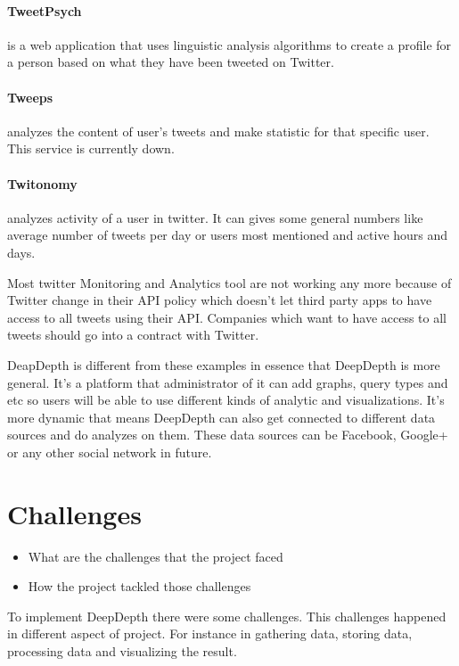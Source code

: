 \documentclass[a4paper,11pt]{report}
\begin{document}
\paragraph{TweetPsych} is a web application that uses linguistic analysis algorithms to create a profile for a person based on what they have been tweeted on Twitter.\cite{tweetpsych}

\paragraph{Tweeps} analyzes the content of user's tweets and make statistic for that specific user. This service is currently down.\cite{tweeps}

\paragraph{Twitonomy} analyzes activity of a user in twitter. It can gives some general numbers like average number of tweets per day or users most mentioned and active hours and days. \cite{twitonomy}

Most twitter Monitoring and Analytics tool are not working any more because of Twitter change in their API policy which doesn't let third party apps to have access to all tweets using their API. Companies which want to have access to all tweets should go into a contract with Twitter\cite{twitterfirehose}.

DeapDepth is different from these examples in essence that DeepDepth is more general. It's a platform that administrator of it can add graphs, query types and etc so users will be able to use different kinds of analytic and visualizations. It's more dynamic that means DeepDepth can also get connected to different data sources and do analyzes on them. These data sources can be Facebook, Google+ or any other social network in future.

\section{Challenges}

\begin{itemize}
\item What are the challenges that the project faced
\item How the project tackled those challenges
\end{itemize}

To implement DeepDepth there were some challenges. This challenges happened in different aspect of project. For instance in gathering data, storing data, processing data and visualizing the result.
\end{document}
